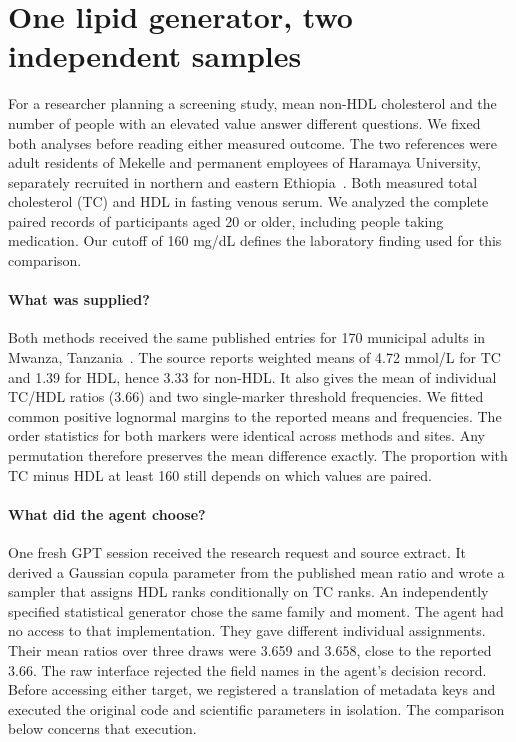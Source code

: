 \section{One lipid generator, two independent samples}
\label{sec:nonhdl}
For a researcher planning a screening study, mean non-HDL cholesterol and the number of people with an elevated value answer different questions. We fixed both analyses before reading either measured outcome. The two references were adult residents of Mekelle and permanent employees of Haramaya University, separately recruited in northern and eastern Ethiopia~\cite{mekelle,haramaya}. Both measured total cholesterol (TC) and HDL in fasting venous serum. We analyzed the complete paired records of participants aged 20 or older, including people taking medication. Our cutoff of 160 mg/dL defines the laboratory finding used for this comparison.

\paragraph{What was supplied?}
Both methods received the same published entries for 170 municipal adults in Mwanza, Tanzania~\cite{kavishe}. The source reports weighted means of 4.72 mmol/L for TC and 1.39 for HDL, hence 3.33 for non-HDL. It also gives the mean of individual TC/HDL ratios (3.66) and two single-marker threshold frequencies. We fitted common positive lognormal margins to the reported means and frequencies. The order statistics for both markers were identical across methods and sites. Any permutation therefore preserves the mean difference exactly. The proportion with TC minus HDL at least 160 still depends on which values are paired.

\paragraph{What did the agent choose?}
One fresh GPT session received the research request and source extract. It derived a Gaussian copula parameter from the published mean ratio and wrote a sampler that assigns HDL ranks conditionally on TC ranks. An independently specified statistical generator chose the same family and moment. The agent had no access to that implementation. They gave different individual assignments. Their mean ratios over three draws were 3.659 and 3.658, close to the reported 3.66. The raw interface rejected the field names in the agent's decision record. Before accessing either target, we registered a translation of metadata keys and executed the original code and scientific parameters in isolation. The comparison below concerns that execution.

